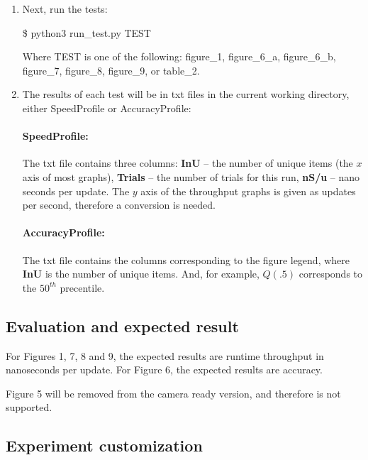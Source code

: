 \documentclass[onecolumn]{sigplanconf}
\begin{document}
{\begin{enumerate}
  \item Next, run the tests:

  \begin{framed}

  \$ python3 run\_test.py TEST

  \end{framed}

  \noindent Where TEST is one of the following: figure\_1, figure\_6\_a, figure\_6\_b, figure\_7, figure\_8, figure\_9, or table\_2.


  \item \label{n:run-test} The results of each test will be in txt files in the current working directory, either SpeedProfile or AccuracyProfile:
  \paragraph{\textbf{SpeedProfile:}} The txt file contains three columns: \textbf{InU} -- the number of unique items (the $x$
  axis of most graphs), \textbf{Trials} -- the number of trials for this run, \textbf{nS/u} -- nano seconds per update. The $y$
  axis of the throughput graphs is given as updates per second, therefore a conversion is needed.
  \paragraph{\textbf{AccuracyProfile:}} The txt file contains the columns corresponding to the figure legend, where
  \textbf{InU} is the number of unique items. And, for example, $Q(.5)$ corresponds to the $50^{th}$ precentile.

\end{enumerate}


\subsection{Evaluation and expected result}


For Figures 1, 7, 8 and 9, the expected results are runtime throughput in nanoseconds
per update. For Figure 6, the expected results are accuracy.

Figure 5 will be removed from the camera ready version, and therefore is not supported.

\subsection{Experiment customization}

}
\end{document}

